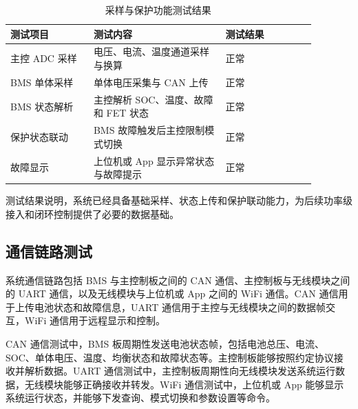 \begin{table}[htbp]
  \centering
  \caption{采样与保护功能测试结果}
  \label{tab:sampling_protection_test}
  \renewcommand{\arraystretch}{1.2}
  \begin{tabular}{|m{0.24\linewidth}|m{0.38\linewidth}|m{0.26\linewidth}|}
    \hline
    \rule{0pt}{1.0cm}测试项目 & 测试内容 & 测试结果 \\
    \hline
    \rule{0pt}{1.0cm}主控 ADC 采样 & 电压、电流、温度通道采样与换算 & 正常 \\
    \hline
    \rule{0pt}{1.0cm}BMS 单体采样 & 单体电压采集与 CAN 上传 & 正常 \\
    \hline
    \rule{0pt}{1.0cm}BMS 状态解析 & 主控解析 SOC、温度、故障和 FET 状态 & 正常 \\
    \hline
    \rule{0pt}{1.0cm}保护状态联动 & BMS 故障触发后主控限制模式切换 & 正常 \\
    \hline
    \rule{0pt}{1.0cm}故障显示 & 上位机或 App 显示异常状态与故障提示 & 正常 \\
    \hline
  \end{tabular}
\end{table}

测试结果说明，系统已经具备基础采样、状态上传和保护联动能力，为后续功率级接入和闭环控制提供了必要的数据基础。

\subsection{通信链路测试}

系统通信链路包括 BMS 与主控制板之间的 CAN 通信、主控制板与无线模块之间的 UART 通信，以及无线模块与上位机或 App 之间的 WiFi 通信。CAN 通信用于上传电池状态和故障信息，UART 通信用于主控与无线模块之间的数据帧交互，WiFi 通信用于远程显示和控制。

CAN 通信测试中，BMS 板周期性发送电池状态帧，包括电池总压、电流、SOC、单体电压、温度、均衡状态和故障状态等。主控制板能够按照约定协议接收并解析数据。UART 通信测试中，主控制板周期性向无线模块发送系统运行数据，无线模块能够正确接收并转发。WiFi 通信测试中，上位机或 App 能够显示系统运行状态，并能够下发查询、模式切换和参数设置等命令。

